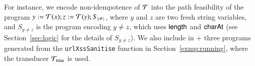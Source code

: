 %
For instance, we encode non-idempotence of $\mathcal{T}$ into the path feasibility of the {\slint} program $y:=\mathcal{T}(x); z:=\mathcal{T}(y); S_{y \neq z}$, where $y$ and $z$ are two fresh string variables, and $S_{y \neq z}$ is the {\slint} program encoding $y \neq z$, which uses $\mathsf{length}$ and $\mathsf{charAt}$ (see Section~\ref{sec:logic} for the details of $S_{y \neq z}$). We also include in {\transducerbench+} three {\slint} programs generated from the {\tt urlXssSanitise} function in Section~\ref{exmp:running}, 
where the transducer $\mathcal{T}_{\rm trim}$ is used. 
%
%
%
%

